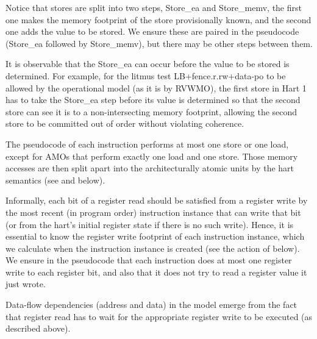Notice that stores are split into two steps, {\sc Store\_ea} and {\sc Store\_memv}, the first one makes the memory footprint of the store provisionally known, and the second one adds the value to be stored.
We ensure these are paired in the pseudocode ({\sc Store\_ea} followed by {\sc Store\_memv}), but there may be other steps between them.
\begin{commentary}
It is observable that the {\sc Store\_ea} can occur before the value to be stored is determined.
For example, for the litmus test LB+fence.r.rw+data-po to be allowed by the operational model (as it is by RVWMO), the first store in Hart 1 has to take the {\sc Store\_ea} step before its value is determined so that the second store can see it is to a non-intersecting memory footprint, allowing the second store to be committed out of order without violating coherence.
\end{commentary}

The pseudocode of each instruction performs at most one store or one load, except for AMOs that perform exactly one load and one store.
Those memory accesses are then split apart into the architecturally atomic units by the hart semantics (see  and  below).

Informally, each bit of a register read should be satisfied from a register write by the most recent (in program order) instruction instance that can write that bit (or from the hart's initial register state if there is no such write).
Hence, it is essential to know the register write footprint of each instruction instance, which we calculate when the instruction instance is created (see the action of  below).
We ensure in the pseudocode that each instruction does at most one register write to each register bit, and also that it does not try to read a register value it just wrote.

Data-flow dependencies (address and data) in the model emerge from the fact that register read has to wait for the appropriate register write to be executed (as described above).

